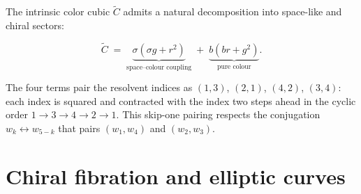 \begin{remark}
  \label{rem:intrinsic-color-cubic-pairing}
The intrinsic color cubic $\widetilde{C}$ admits a natural decomposition into space-like and chiral sectors:

\begin{equation}\label{eq:color-cubic-decomp}
  \widetilde{C}
  \;=\;
  \underbrace{\sigma(\sigma g + r^2)}_{\text{space--colour coupling}}
  \;+\;
  \underbrace{b(br + g^2)}_{\text{pure colour}}.
\end{equation}

The four terms pair the resolvent indices as $(1,3)$, $(2,1)$, $(4,2)$,
$(3,4)$: each index is squared and contracted with the index two steps
ahead in the cyclic order $1 \to 3 \to 4 \to 2 \to 1$.  This
skip-one pairing respects the conjugation $w_k \leftrightarrow w_{5-k}$
that pairs $(w_1, w_4)$ and $(w_2, w_3)$.
\end{remark}

\section{Chiral fibration and elliptic curves}
\label{sec:chiral-fibration}

